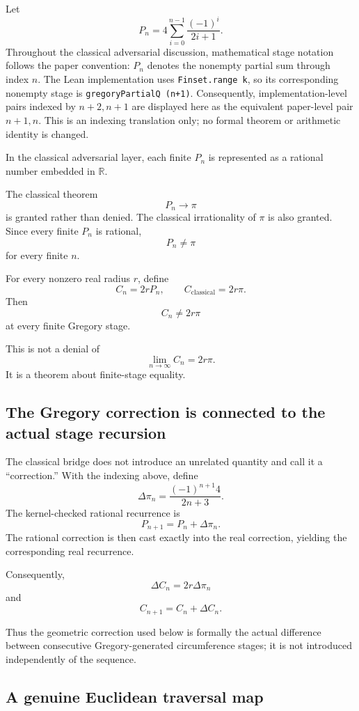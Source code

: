 \documentclass[11pt,a4paper]{article}
\begin{document}
Let
\[
P_n
=
4\sum_{i=0}^{n-1}\frac{(-1)^i}{2i+1}.
\]
Throughout the classical adversarial discussion, mathematical
stage notation follows the paper convention: \(P_n\) denotes the
nonempty partial sum through index \(n\).  The Lean implementation
uses \texttt{Finset.range k}, so its corresponding nonempty stage is
\texttt{gregoryPartialQ (n+1)}.  Consequently, implementation-level
pairs indexed by \(n+2,n+1\) are displayed here as the equivalent
paper-level pair \(n+1,n\).  This is an indexing translation only; no
formal theorem or arithmetic identity is changed.

In the classical adversarial layer, each finite $P_n$ is represented
as a rational number embedded in $\mathbb R$.

The classical theorem
\[
P_n\longrightarrow\pi
\]
is granted rather than denied.  The classical irrationality of
$\pi$ is also granted.  Since every finite $P_n$ is rational,
\[
\boxed{P_n\neq\pi}
\]
for every finite $n$.

For every nonzero real radius $r$, define
\[
C_n=2rP_n,
\qquad
C_{\mathrm{classical}}=2r\pi.
\]
Then
\[
\boxed{C_n\neq2r\pi}
\]
at every finite Gregory stage.

This is not a denial of
\[
\lim_{n\to\infty}C_n=2r\pi.
\]
It is a theorem about finite-stage equality.

\subsection{The Gregory correction is connected to the actual stage recursion}

The classical bridge does not introduce an unrelated quantity and call
it a ``correction.''  With the indexing above, define
\[
\Delta\pi_n
=
\frac{(-1)^{n+1}4}{2n+3}.
\]
The kernel-checked rational recurrence is
\[
\boxed{
P_{n+1}
=
P_n
+
\Delta\pi_n.
}
\]
The rational correction is then cast exactly into the real correction,
yielding the corresponding real recurrence.

Consequently,
\[
\Delta C_n
=
2r\Delta\pi_n
\]
and
\[
\boxed{
C_{n+1}
=
C_n
+
\Delta C_n.
}
\]

Thus the geometric correction used below is formally the actual
difference between consecutive Gregory-generated circumference stages;
it is not introduced independently of the sequence.

\subsection{A genuine Euclidean traversal map}
\end{document}
